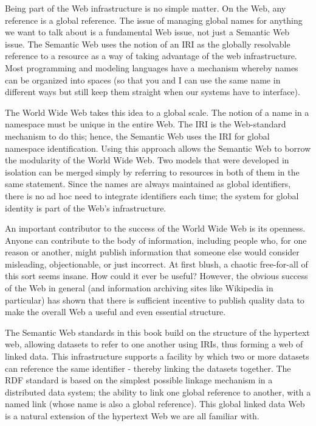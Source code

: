 Being part of the Web infrastructure is no simple matter. On the Web,
any reference is a global reference. The issue of managing global names
for anything we want to talk about is a fundamental Web issue, not just
a Semantic Web issue. The Semantic Web uses the notion of an IRI as the
globally resolvable reference to a resource as a way of taking advantage
of the web infrastructure. Most programming and modeling languages have
a mechanism whereby names can be organized into spaces (so that you and
I can use the same name in different ways but still keep them straight
when our systems have to interface). 

The World Wide Web takes this idea to a global scale.  The notion of a name in a namespace must be
unique  in the entire Web.
The IRI is the Web-standard mechanism to do this; hence, the Semantic
Web uses the IRI for global namespace identification. Using this
approach allows the Semantic Web to borrow the modularity of the World
Wide Web. Two models that were developed in isolation can be merged
simply by referring to resources in both of them in the same statement.
Since the names are always maintained as global identifiers, there is no
ad hoc need to integrate identifiers each time; the system for global
identity is part of the Web's infrastructure.

An important contributor to the success of the World Wide Web is its
openness. Anyone can contribute to the body of information, including
people who, for one reason or another, might publish information that
someone else would consider misleading, objectionable, or just
incorrect. At first blush, a chaotic free-for-all of this sort seems
insane. How could it ever be useful? However, the obvious success of the Web in general
(and information archiving sites like Wikipedia in particular) has shown
that there is sufficient incentive to publish quality data to make the
overall Web a useful and even essential structure.

The Semantic Web standards in this book build on the structure of the 
hypertext web, allowing datasets to refer to one another using IRIs, thus 
forming a web of linked data.  This infrastructure supports a facility by which 
two or more datasets can reference the same identifier - thereby linking
the datasets together.  The RDF standard is based on the simplest possible 
linkage mechanism in a distributed data system; the ability to link 
one global reference to another, with a named link (whose name is also a global reference). 
This global linked data Web is a natural extension of the hypertext Web 
we are all familiar with. 

